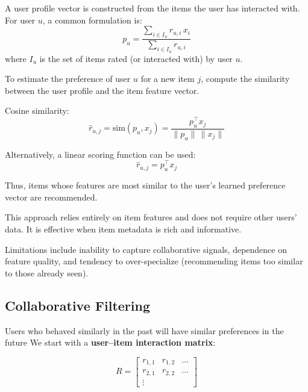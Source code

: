 \documentclass[10pt,a4paper]{article}
\begin{document}
	\vspace{0.3em}

	A user profile vector is constructed from the items the user has interacted with. For user $u$, a common formulation is:
	\[
	p_u = \frac{\sum_{i \in I_u} r_{u,i}\, x_i}{\sum_{i \in I_u} r_{u,i}}
	\]
	where $I_u$ is the set of items rated (or interacted with) by user $u$.

	\vspace{0.3em}

	To estimate the preference of user $u$ for a new item $j$, compute the similarity between the user profile and the item feature vector.

	Cosine similarity:
	\[
	\hat{r}_{u,j} = \text{sim}(p_u, x_j) =
	\frac{p_u^\top x_j}{\|p_u\| \, \|x_j\|}
	\]

	\vspace{0.3em}

	Alternatively, a linear scoring function can be used:
	\[
	\hat{r}_{u,j} = p_u^\top x_j
	\]

	\vspace{0.3em}

	Thus, items whose features are most similar to the user's learned preference vector are recommended.

	\vspace{0.3em}

	This approach relies entirely on item features and does not require other users' data. It is effective when item metadata is rich and informative.

	\vspace{0.3em}

	Limitations include inability to capture collaborative signals, dependence on feature quality, and tendency to over-specialize (recommending items too similar to those already seen).


	\subsection{Collaborative Filtering}
	Users who behaved similarly in the past will have similar preferences in the future
	We start with a \textbf{user–item interaction matrix}:

	\[
	R =
	\begin{bmatrix}
		r_{1,1} & r_{1,2} & \dots \\
		r_{2,1} & r_{2,2} & \dots \\
		\vdots
	\end{bmatrix}
	\]
\end{document}
